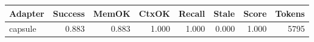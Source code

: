 \begin{tabular}{lrrrrrrr}
\hline
Adapter & Success & MemOK & CtxOK & Recall & Stale & Score & Tokens \\
\hline
capsule & 0.883 & 0.883 & 1.000 & 1.000 & 0.000 & 1.000 & 5795 \\
\hline
\end{tabular}

